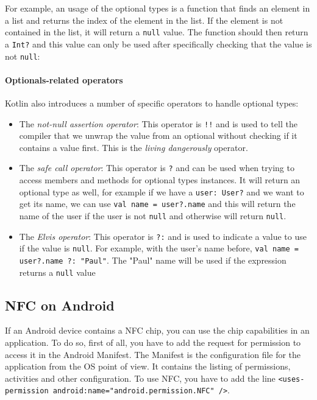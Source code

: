 \documentclass[11pt,a4paper]{report}
\begin{document}
For example, an usage of the optional types is a function that finds an element in a list and returns the index of the element in the list. If the element is not contained in the list, it will return a \texttt{null} value. The function should then return a \texttt{Int?} and this value can only be used after specifically checking that the value is not \texttt{null}:

\paragraph{Optionals-related operators}
\label{optional_operators_kt}
Kotlin also introduces a number of specific operators to handle optional types:
\begin{itemize}
	\item The \emph{not-null assertion operator}: This operator is \verb+!!+ and is used to tell the compiler that we unwrap the value from an optional without checking if it contains a value first. This is the \emph{living dangerously} operator.
	\item The \emph{safe call operator}: This operator is \verb+?+ and can be used when trying to access members and methods for optional types instances. It will return an optional type as well, for example if we have a \texttt{user: User?} and we want to get its name, we can use \texttt{val name = user?.name} and this will return the name of the user if the user is not \texttt{null} and otherwise will return \texttt{null}.
	\item The \emph{Elvis operator}: This operator is \verb+?:+ and is used to indicate a value to use if the value is \texttt{null}. For example, with the user's name before, \texttt{val name = user?.name ?: "Paul"}. The "Paul" name will be used if the expression returns a \texttt{null} value
\end{itemize}

\subsection{NFC on Android}
If an Android device contains a NFC chip, you can use the chip capabilities in an application. To do so, first of all, you have to add the request for permission to access it in the Android Manifest. The Manifest is the configuration file for the application from the OS point of view. It contains the listing of permissions, activities and other configuration. To use NFC, you have to add the line \texttt{<uses-permission android:name="android.permission.NFC" />}. \\
\end{document}
